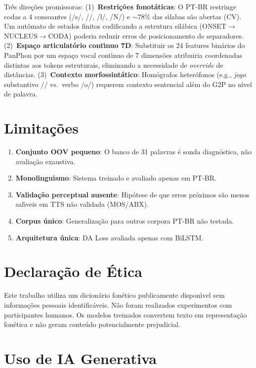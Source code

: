 \documentclass[12pt]{article}
\newcommand{\ipaO}{\textipa{O}}%
\begin{document}
Tr\^es dire\c{c}\~oes promissoras:
(1)~\textbf{Restri\c{c}\~oes fonot\'aticas}: O PT-BR restringe codas
a 4 consoantes (/s/, //, /l/, /N/) e ${\sim}$78\% das
s\'{\i}labas s\~ao abertas (CV). Um aut\^omato de estados finitos
codificando a estrutura sil\'abica (ONSET$\to$NUCLEUS$\to$CODA)
poderia reduzir erros de posicionamento de separadores.
(2)~\textbf{Espa\c{c}o articulat\'orio cont\'{\i}nuo 7D}: Substituir
os 24 features bin\'arios do PanPhon por um espa\c{c}o vocal cont\'{\i}nuo
de 7 dimens\~oes atribuiria coordenadas distintas aos tokens
estruturais, eliminando a necessidade de \emph{override} de
dist\^ancias.
(3)~\textbf{Contexto morfossint\'atico}: Hom\'ografos heter\'ofonos
(e.g., \emph{jogo} substantivo /\ipaO{}/ vs.\ verbo /o/)
requerem contexto sentencial al\'em do G2P no n\'{\i}vel de
palavra.

\section{Limita\c{c}\~oes}

\begin{enumerate}
\item \textbf{Conjunto OOV pequeno}: O banco de 31 palavras \'e sonda
  diagn\'ostica, n\~ao avalia\c{c}\~ao exaustiva.
\item \textbf{Monolinguismo}: Sistema treinado e avaliado apenas em PT-BR.
\item \textbf{Valida\c{c}\~ao perceptual ausente}: Hip\'otese de que erros
  pr\'oximos s\~ao menos sal\'{\i}veis em TTS n\~ao validada (MOS/ABX).
\item \textbf{Corpus \'unico}: Generaliza\c{c}\~ao para outros corpora
  PT-BR n\~ao testada.
\item \textbf{Arquitetura \'unica}: DA Loss avaliada apenas com BiLSTM.
\end{enumerate}

\section{Declara\c{c}\~ao de \'Etica}

Este trabalho utiliza um dicion\'ario fon\'etico publicamente
dispon\'{\i}vel sem informa\c{c}\~oes pessoais identific\'aveis.
N\~ao foram realizados experimentos com participantes humanos.
Os modelos treinados convertem texto em representa\c{c}\~ao fon\'etica e
n\~ao geram conte\'udo potencialmente prejudicial.

\section{Uso de IA Generativa}
\end{document}
